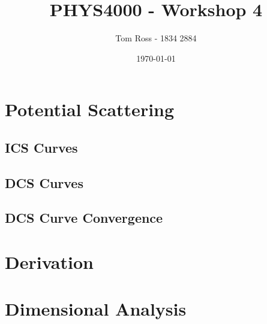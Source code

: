 \documentclass{article}
\title{PHYS4000 - Workshop 4}
\author{Tom Ross - 1834 2884}
\date{\today}
\begin{document}
\tableofcontents

\listoffigures

\listoftables

\clearpage

\section{Potential Scattering}
\label{sec:potential-scattering}

\subsection{ICS Curves}
\label{sec:ics-curves}

\begin{figure}[h]
  \begin{center}
    
  \end{center}
  \caption[Electron ICS Curves]{
  }
  \label{fig:ele-ics-curves}
\end{figure}

\begin{figure}[h]
  \begin{center}
    
  \end{center}
  \caption[Positron ICS Curves]{
  }
  \label{fig:pos-ics-curves}
\end{figure}

\subsection{DCS Curves}
\label{sec:dcs-curves}

\subsection{DCS Curve Convergence}
\label{sec:dcs-curve-conv}

\section{Derivation}
\label{sec:derivation}

\section{Dimensional Analysis}
\label{sec:dimensional-analysis}
\end{document}
